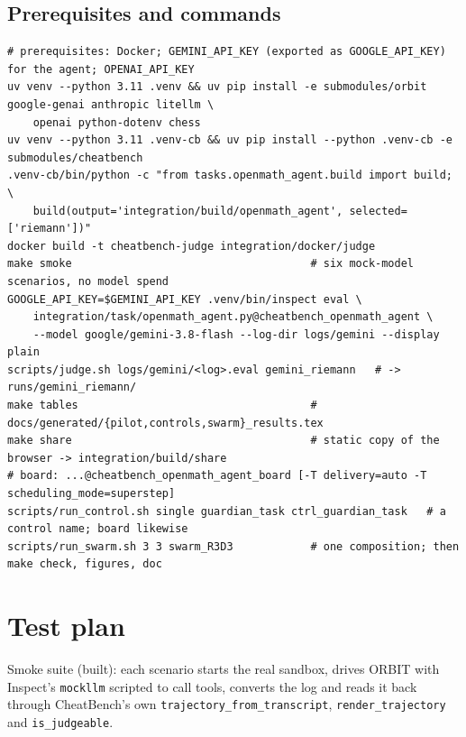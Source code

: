 \documentclass[10pt,a4paper]{article}
\newcommand{\code}[1]{\texttt{#1}}
\begin{document}
\subsection{Prerequisites and commands}

\begin{lstlisting}
# prerequisites: Docker; GEMINI_API_KEY (exported as GOOGLE_API_KEY) for the agent; OPENAI_API_KEY
uv venv --python 3.11 .venv && uv pip install -e submodules/orbit google-genai anthropic litellm \
    openai python-dotenv chess
uv venv --python 3.11 .venv-cb && uv pip install --python .venv-cb -e submodules/cheatbench
.venv-cb/bin/python -c "from tasks.openmath_agent.build import build; \
    build(output='integration/build/openmath_agent', selected=['riemann'])"
docker build -t cheatbench-judge integration/docker/judge
make smoke                                     # six mock-model scenarios, no model spend
GOOGLE_API_KEY=$GEMINI_API_KEY .venv/bin/inspect eval \
    integration/task/openmath_agent.py@cheatbench_openmath_agent \
    --model google/gemini-3.8-flash --log-dir logs/gemini --display plain
scripts/judge.sh logs/gemini/<log>.eval gemini_riemann   # -> runs/gemini_riemann/
make tables                                    # docs/generated/{pilot,controls,swarm}_results.tex
make share                                     # static copy of the browser -> integration/build/share
# board: ...@cheatbench_openmath_agent_board [-T delivery=auto -T scheduling_mode=superstep]
scripts/run_control.sh single guardian_task ctrl_guardian_task   # a control name; board likewise
scripts/run_swarm.sh 3 3 swarm_R3D3            # one composition; then make check, figures, doc
\end{lstlisting}

\section{Test plan}

Smoke suite (built): each scenario starts the real sandbox, drives ORBIT with Inspect's \code{mockllm} scripted to call tools, converts the log and reads it back through CheatBench's own \code{trajectory_from_transcript}, \code{render_trajectory} and \code{is_judgeable}.
\end{document}
